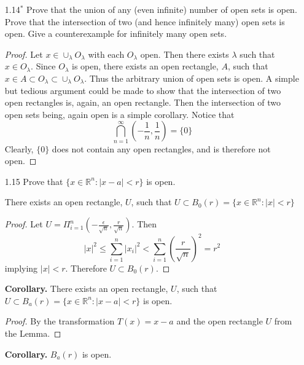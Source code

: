 \begin{enumerate}
    \item[1.14\( ^*\)] Prove that the union of any (even infinite) number of open sets is open. Prove that the intersection of two (and hence infinitely many) open sets is open. Give a counterexample for infinitely many open sets.
    
    \begin{proof}
    Let \( x \in \cup_\lambda O_\lambda \) with each \( O_\lambda \) open. Then there exists \( \lambda \) such that \( x \in O_\lambda \). Since \( O_\lambda \) is open, there exists an open rectangle, \( A \), such that \( x \in A \subset O_\lambda \subset \cup_\lambda O_\lambda \). Thus the arbitrary union of open sets is open. A simple but tedious argument could be made to show that the intersection of two open rectangles is, again, an open rectangle. Then the intersection of two open sets being, again open is a simple corollary. Notice that
    \[
    \bigcap_{n=1}^\infty \left( -\frac{1}{n}, \frac{1}{n} \right) = \{ 0 \}
    \]
    Clearly, \( \{ 0 \} \) does not contain any open rectangles, and is therefore not open. 
    \end{proof}
    
    \item[1.15] Prove that \( \{ x \in \mathbb{R}^n : \left| x-a \right| < r \}\) is open.
    
    \begin{lemma}
    There exists an open rectangle, \( U \), such that \( U \subset B_0(r)=\{ x \in \mathbb{R}^n: \left| x \right| < r \} \)
    \end{lemma}
    
    \begin{proof}
    Let \( U = \Pi_{i=1}^n (-\frac{\epsilon}{\sqrt{n}}, \frac{r}{\sqrt{n}})  \). Then
    \[
    \left| x \right|^2 \leq \sum_{i=1}^n \left|x_i\right|^2 < \sum_{i=1}^n \left(\frac{r}{\sqrt{n}}\right)^2 = r^2
    \]
    implying \( \left| x \right| < r \). Therefore \( U \subset B_0(r) \). 
    \end{proof}
    
    \textbf{Corollary.} There exists an open rectangle, \( U \), such that \( U \subset B_a(r) = \{ x\in \mathbb{R}^n: \left| x-a \right| < r \} \) is open.
    
    \begin{proof}
    By the transformation \( T(x) = x-a \) and the open rectangle \( U \) from the Lemma. 
    \end{proof}
    
    \textbf{Corollary.} \( B_a(r) \) is open.
    

\end{enumerate}
